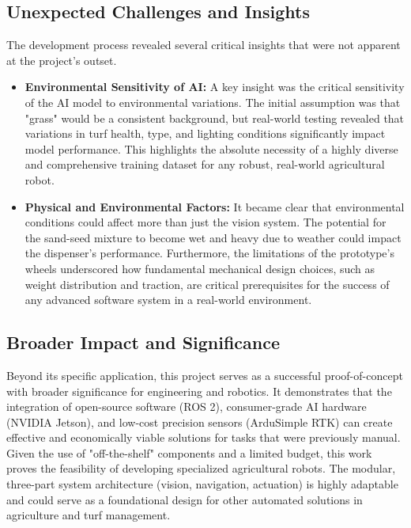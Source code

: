 \subsection{Unexpected Challenges and Insights}
The development process revealed several critical insights that were not apparent at the project's outset.
\begin{itemize}
    \item \textbf{Environmental Sensitivity of AI:} A key insight was the critical sensitivity of the AI model to environmental variations. The initial assumption was that "grass" would be a consistent background, but real-world testing revealed that variations in turf health, type, and lighting conditions significantly impact model performance. This highlights the absolute necessity of a highly diverse and comprehensive training dataset for any robust, real-world agricultural robot.
    \item \textbf{Physical and Environmental Factors:} It became clear that environmental conditions could affect more than just the vision system. The potential for the sand-seed mixture to become wet and heavy due to weather could impact the dispenser's performance. Furthermore, the limitations of the prototype's wheels underscored how fundamental mechanical design choices, such as weight distribution and traction, are critical prerequisites for the success of any advanced software system in a real-world environment.
\end{itemize}

\subsection{Broader Impact and Significance}
Beyond its specific application, this project serves as a successful proof-of-concept with broader significance for engineering and robotics. It demonstrates that the integration of open-source software (ROS 2), consumer-grade AI hardware (NVIDIA Jetson), and low-cost precision sensors (ArduSimple RTK) can create effective and economically viable solutions for tasks that were previously manual. Given the use of "off-the-shelf" components and a limited budget, this work proves the feasibility of developing specialized agricultural robots. The modular, three-part system architecture (vision, navigation, actuation) is highly adaptable and could serve as a foundational design for other automated solutions in agriculture and turf management.


